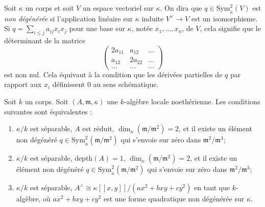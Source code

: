 \noindent
Soit $\kappa$ un corps et soit $V$ un espace vectoriel sur $\kappa$. On dira que $q \in \text{Sym}^2_\kappa(V)$ est {\it non dégénérée} si l'application linéaire sur $\kappa$ induite $V^\vee \to V$ est un isomorphisme. Si $q = \sum_{i \leq j} a_{ij} x_i x_j$ pour une base sur $\kappa$, notée $x_1, \ldots, x_n$, de $V$, cela signifie que le déterminant de la matrice $$
\left(
\begin{matrix}
2a_{11} & a_{12} & \ldots \\
a_{12} & 2a_{22} & \ldots \\
\ldots & \ldots & \ldots
\end{matrix}
\right)
$$ est non nul. Cela équivaut à la condition que les dérivées partielles de $q$ par rapport aux $x_i$ définissent $0$ au sens schématique.

\begin{lemma}
\label{lemma-nodal-algebraic}
Soit $k$ un corps. Soit $(A, \mathfrak m, \kappa)$ une $k$-algèbre locale noethérienne. Les conditions suivantes sont équivalentes : \begin{enumerate} \item $\kappa/k$ est séparable, $A$ est réduit, $\dim_\kappa(\mathfrak m/\mathfrak m^2) = 2$, et il existe un élément non dégénéré $q \in \text{Sym}^2_\kappa(\mathfrak m/\mathfrak m^2)$ qui s'envoie sur zéro dans $\mathfrak m^2/\mathfrak m^3$; \item $\kappa/k$ est séparable, $\text{depth}(A) = 1$, $\dim_\kappa(\mathfrak m/\mathfrak m^2) = 2$, et il existe un élément non dégénéré $q \in \text{Sym}^2_\kappa(\mathfrak m/\mathfrak m^2)$ qui s'envoie sur zéro dans $\mathfrak m^2/\mathfrak m^3$; \item $\kappa/k$ est séparable, $A^\wedge \cong \kappa[[x, y]]/(ax^2 + bxy + cy^2)$ en tant que $k$-algèbre, où $ax^2 + bxy + cy^2$ est une forme quadratique non dégénérée sur $\kappa$.
\end{enumerate}
\end{lemma}

